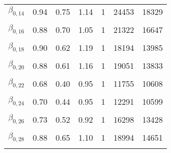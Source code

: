 \begin{table}
\begin{tabular}[t]{lrrrrrr}
$\beta_{0, 14}$ & 0.94 & 0.75 & 1.14 & 1 & 24453 & 18329\\
\cellcolor{gray!6}{$\beta_{0, 15}$} & \cellcolor{gray!6}{0.97} & \cellcolor{gray!6}{0.75} & \cellcolor{gray!6}{1.21} & \cellcolor{gray!6}{1} & \cellcolor{gray!6}{22418} & \cellcolor{gray!6}{16054}\\
$\beta_{0, 16}$ & 0.88 & 0.70 & 1.05 & 1 & 21322 & 16647\\
\cellcolor{gray!6}{$\beta_{0, 17}$} & \cellcolor{gray!6}{0.81} & \cellcolor{gray!6}{0.59} & \cellcolor{gray!6}{1.04} & \cellcolor{gray!6}{1} & \cellcolor{gray!6}{16634} & \cellcolor{gray!6}{12850}\\
$\beta_{0, 18}$ & 0.90 & 0.62 & 1.19 & 1 & 18194 & 13985\\
\cellcolor{gray!6}{$\beta_{0, 19}$} & \cellcolor{gray!6}{0.88} & \cellcolor{gray!6}{0.65} & \cellcolor{gray!6}{1.11} & \cellcolor{gray!6}{1} & \cellcolor{gray!6}{19421} & \cellcolor{gray!6}{14451}\\
$\beta_{0, 20}$ & 0.88 & 0.61 & 1.16 & 1 & 19051 & 13833\\
\cellcolor{gray!6}{$\beta_{0, 21}$} & \cellcolor{gray!6}{0.58} & \cellcolor{gray!6}{0.32} & \cellcolor{gray!6}{0.82} & \cellcolor{gray!6}{1} & \cellcolor{gray!6}{8693} & \cellcolor{gray!6}{10396}\\
$\beta_{0, 22}$ & 0.68 & 0.40 & 0.95 & 1 & 11755 & 10608\\
\cellcolor{gray!6}{$\beta_{0, 23}$} & \cellcolor{gray!6}{0.90} & \cellcolor{gray!6}{0.70} & \cellcolor{gray!6}{1.10} & \cellcolor{gray!6}{1} & \cellcolor{gray!6}{19835} & \cellcolor{gray!6}{16393}\\
$\beta_{0, 24}$ & 0.70 & 0.44 & 0.95 & 1 & 12291 & 10599\\
\cellcolor{gray!6}{$\beta_{0, 25}$} & \cellcolor{gray!6}{0.97} & \cellcolor{gray!6}{0.76} & \cellcolor{gray!6}{1.19} & \cellcolor{gray!6}{1} & \cellcolor{gray!6}{20912} & \cellcolor{gray!6}{17797}\\
$\beta_{0, 26}$ & 0.73 & 0.52 & 0.92 & 1 & 16298 & 13428\\
\cellcolor{gray!6}{$\beta_{0, 27}$} & \cellcolor{gray!6}{0.82} & \cellcolor{gray!6}{0.68} & \cellcolor{gray!6}{0.97} & \cellcolor{gray!6}{1} & \cellcolor{gray!6}{29399} & \cellcolor{gray!6}{16375}\\
$\beta_{0, 28}$ & 0.88 & 0.65 & 1.10 & 1 & 18994 & 14651\\
\cellcolor{gray!6}{$\beta_{0, 29}$} & \cellcolor{gray!6}{0.84} & \cellcolor{gray!6}{0.55} & \cellcolor{gray!6}{1.12} & \cellcolor{gray!6}{1} & \cellcolor{gray!6}{15361} & \cellcolor{gray!6}{9707}\\

\end{tabular}
\end{table}

